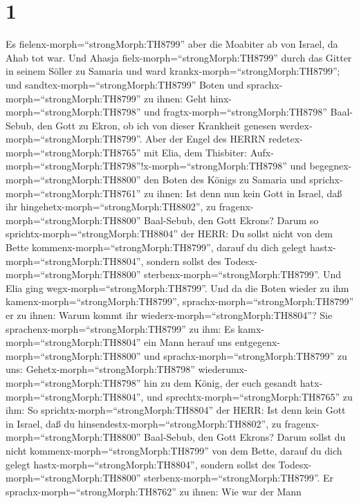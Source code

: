 \hypertarget{section}{%
\section{1}\label{section}}

 Es fielenx-morph=``strongMorph:TH8799'' aber die Moabiter
ab von Israel, da Ahab tot war.  Und Ahasja
fielx-morph=``strongMorph:TH8799'' durch das Gitter in seinem Söller zu
Samaria und ward krankx-morph=``strongMorph:TH8799''; und
sandtex-morph=``strongMorph:TH8799'' Boten und
sprachx-morph=``strongMorph:TH8799'' zu ihnen: Geht
hinx-morph=``strongMorph:TH8798'' und
fragtx-morph=``strongMorph:TH8798'' Baal-Sebub, den Gott zu Ekron, ob
ich von dieser Krankheit genesen werdex-morph=``strongMorph:TH8799''.
 Aber der Engel des HERRN
redetex-morph=``strongMorph:TH8765'' mit Elia, dem Thisbiter:
Aufx-morph=``strongMorph:TH8798''!x-morph=``strongMorph:TH8798'' und
begegnex-morph=``strongMorph:TH8800'' den Boten des Königs zu Samaria
und sprichx-morph=``strongMorph:TH8761'' zu ihnen: Ist denn nun kein
Gott in Israel, daß ihr hingehetx-morph=``strongMorph:TH8802'', zu
fragenx-morph=``strongMorph:TH8800'' Baal-Sebub, den Gott Ekrons?
 Darum so sprichtx-morph=``strongMorph:TH8804'' der HERR: Du
sollst nicht von dem Bette kommenx-morph=``strongMorph:TH8799'', darauf
du dich gelegt hastx-morph=``strongMorph:TH8804'', sondern sollst des
Todesx-morph=``strongMorph:TH8800''
sterbenx-morph=``strongMorph:TH8799''. Und Elia ging
wegx-morph=``strongMorph:TH8799''.  Und da die Boten wieder
zu ihm kamenx-morph=``strongMorph:TH8799'',
sprachx-morph=``strongMorph:TH8799'' er zu ihnen: Warum kommt ihr
wiederx-morph=``strongMorph:TH8804''?  Sie
sprachenx-morph=``strongMorph:TH8799'' zu ihm: Es
kamx-morph=``strongMorph:TH8804'' ein Mann herauf uns
entgegenx-morph=``strongMorph:TH8800'' und
sprachx-morph=``strongMorph:TH8799'' zu uns:
Gehetx-morph=``strongMorph:TH8798''
wiederumx-morph=``strongMorph:TH8798'' hin zu dem König, der euch
gesandt hatx-morph=``strongMorph:TH8804'', und
sprechtx-morph=``strongMorph:TH8765'' zu ihm: So
sprichtx-morph=``strongMorph:TH8804'' der HERR: Ist denn kein Gott in
Israel, daß du hinsendestx-morph=``strongMorph:TH8802'', zu
fragenx-morph=``strongMorph:TH8800'' Baal-Sebub, den Gott Ekrons? Darum
sollst du nicht kommenx-morph=``strongMorph:TH8799'' von dem Bette,
darauf du dich gelegt hastx-morph=``strongMorph:TH8804'', sondern sollst
des Todesx-morph=``strongMorph:TH8800''
sterbenx-morph=``strongMorph:TH8799''.  Er
sprachx-morph=``strongMorph:TH8762'' zu ihnen: Wie war der Mann
